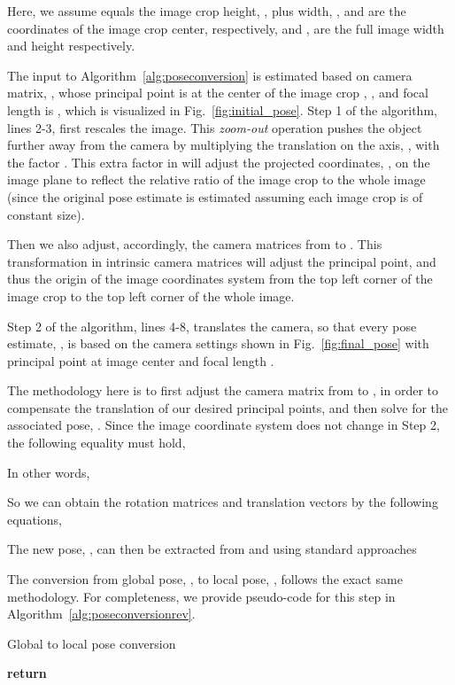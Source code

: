 \documentclass[final]{cvpr}
\begin{document}
Here, we assume  equals the image crop height, , plus width, ,  and  are the  coordinates of the image crop center, respectively, and ,  are the full image width and height respectively.



The input to Algorithm~\ref{alg:poseconversion}  is estimated based on camera matrix, , whose principal point is at the center of the image crop , , and focal length  is , which is visualized in Fig.~\ref{fig:initial_pose}.
Step 1 of the algorithm, lines 2-3, first rescales the image. This {\em zoom-out} operation pushes the object further away from the camera by multiplying the translation on the  axis, , with the factor . This extra factor in  will adjust the projected coordinates, , on the image plane to reflect the relative ratio of the image crop to the whole image (since the original pose estimate  is estimated assuming each image crop is of constant size).

Then we also adjust, accordingly, the camera matrices from  to . This transformation in intrinsic camera matrices will adjust the principal point, and thus the origin of the image coordinates system from the top left corner of the image crop to the top left corner of the whole image. 

Step 2 of the algorithm, lines 4-8, translates the camera, so that every pose estimate, , is based on the camera settings shown in Fig.~\ref{fig:final_pose} with principal point at image center and focal length . 

The methodology here is to first adjust the camera matrix from  to , in order to compensate the translation of our desired principal points, and then solve for the associated pose, . Since the image coordinate system does not change in Step 2, the following equality must hold,


In other words,

So we can obtain the rotation matrices  and translation vectors  by the following equations,


The new pose, , can then be extracted from  and  using standard approaches~\cite{rodrigues, hartley2003multiple}

The conversion from global pose, , to local pose, , follows the exact same methodology. For completeness, we provide pseudo-code for this step in Algorithm~\ref{alg:poseconversionrev}.
\begin{algorithm}[h]
\caption{Global to local pose conversion}
\label{alg:poseconversionrev}
\begin{algorithmic}[1]
	    \State 
	    \State 
	    \State 
	    \State 
	    \State 
	    \State 
	    \State 
	    \State \textbf{return}   
	\EndProcedure
\end{algorithmic}
\end{algorithm}
\end{document}
